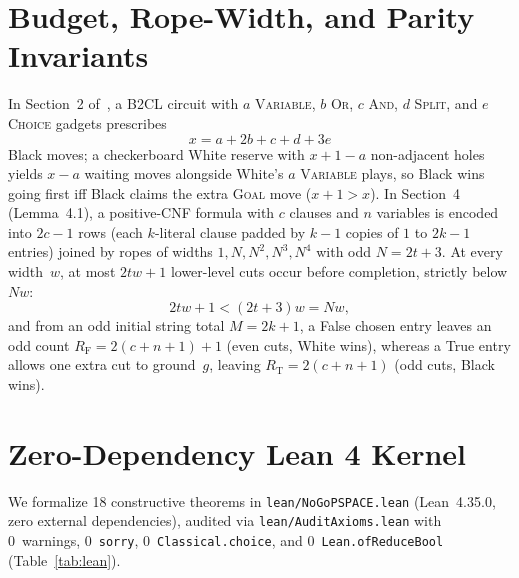 \documentclass[11pt,twocolumn]{article}
\begin{document}
\section{Budget, Rope-Width, and Parity Invariants}\label{sec:prelim}
In Section~2 of~\cite{burke2026nogo}, a B2CL circuit with $a$ \textsc{Variable}, $b$ \textsc{Or}, $c$ \textsc{And}, $d$ \textsc{Split}, and $e$ \textsc{Choice} gadgets prescribes
\begin{equation}
  x = a + 2b + c + d + 3e
  \label{eq:budget}
\end{equation}
Black moves; a checkerboard White reserve with $x+1-a$ non-adjacent holes yields $x-a$ waiting moves alongside White's $a$ \textsc{Variable} plays, so Black wins going first iff Black claims the extra \textsc{Goal} move ($x+1 > x$). In Section~4 (Lemma~4.1), a positive-CNF formula with $c$ clauses and $n$ variables is encoded into $2c-1$ rows (each $k$-literal clause padded by $k-1$ copies of $1$ to $2k-1$ entries) joined by ropes of widths $1, N, N^2, N^3, N^4$ with odd $N = 2t+3$. At every width~$w$, at most $2tw+1$ lower-level cuts occur before completion, strictly below $Nw$:
\begin{equation}
  2tw + 1 < (2t+3)w = Nw,
  \label{eq:rope}
\end{equation}
and from an odd initial string total $M = 2k+1$, a False chosen entry leaves an odd count $R_{\mathrm{F}} = 2(c+n+1)+1$ (even cuts, White wins), whereas a True entry allows one extra cut to ground~$g$, leaving $R_{\mathrm{T}} = 2(c+n+1)$ (odd cuts, Black wins).

\section{Zero-Dependency Lean 4 Kernel}\label{sec:lean}
We formalize 18 constructive theorems in \texttt{lean/NoGoPSPACE.lean} (Lean~4.35.0, zero external dependencies), audited via \texttt{lean/AuditAxioms.lean} with 0~warnings, 0~\texttt{sorry}, 0~\texttt{Classical.choice}, and 0~\texttt{Lean.ofReduceBool} (Table~\ref{tab:lean}).
\end{document}
